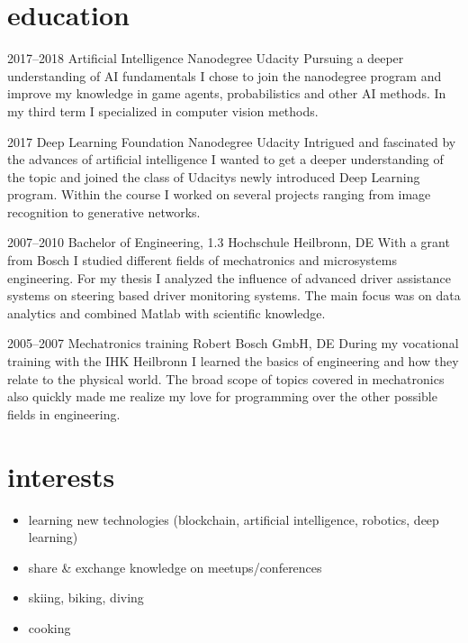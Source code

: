 \documentclass[]{friggeri-cv} %
\begin{document}
\newpage\section{\color{blue}education}

\begin{entrylist}

\entry
{2017--2018}
{Artificial Intelligence {\normalfont Nanodegree}}
{Udacity}
{Pursuing a deeper understanding of AI fundamentals I chose to join the nanodegree program and improve my knowledge in game agents, probabilistics and other AI methods. In my third term I specialized in computer vision methods.}

\entry
{2017}
{Deep Learning {\normalfont Foundation Nanodegree}}
{Udacity}
{Intrigued and fascinated by the advances of artificial intelligence I wanted to get a deeper understanding of the topic and joined the class of Udacitys newly introduced Deep Learning program. Within the course I worked on several projects ranging from image recognition to generative networks.}

\entry
{2007--2010}
{Bachelor {\normalfont of Engineering,} 1.3}
{Hochschule Heilbronn, DE}
{With a grant from Bosch I studied different fields of mechatronics and microsystems engineering. For my thesis I analyzed the influence of advanced driver assistance systems on steering based driver monitoring systems. The main focus was on data analytics and combined Matlab with scientific knowledge.
}

\entry
{2005--2007}
{Mechatronics training}
{Robert Bosch GmbH, DE}
{During my vocational training with the IHK Heilbronn I learned the basics of engineering and how they relate to the physical world. The broad scope of topics covered in mechatronics also quickly made me realize my love for programming over the other possible fields in engineering.
}
\end{entrylist}


\section{\color{green}interests}
\begin{itemize}
\item learning new technologies (blockchain, artificial intelligence, robotics, deep learning)
\item share \& exchange knowledge on meetups/conferences
\item skiing, biking, diving
\item cooking
\end{itemize}
\end{document}
